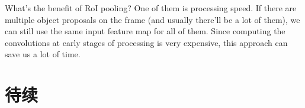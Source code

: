 What’s the benefit of RoI pooling? One of them is processing speed. If there are multiple object proposals on the frame (and usually there’ll be a lot of them), we can still use the same input feature map for all of them. Since computing the convolutions at early stages of processing is very expensive, this approach can save us a lot of time.

\section{待续}













